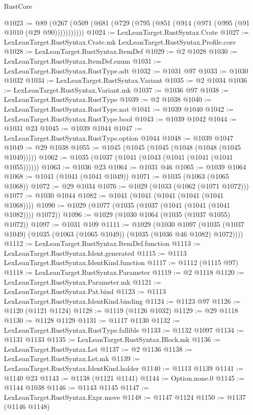 \begin{lexlean}{RustCore}
\begin{coremodule}
@1023 := @89 (@267 (@509 (@681 (@729 (@795 (@851 (@914 (@971 (@995 (@91 @1010 (@29 @90)))))))))))
@1024 := LexLeanTarget.RustSyntax.Crate
@1027 := LexLeanTarget.RustSyntax.Crate.mk LexLeanTarget.RustSyntax.Profile.core
@1028 := LexLeanTarget.RustSyntax.ItemDef
@1029 := @2 @1028
@1030 := LexLeanTarget.RustSyntax.ItemDef.enum
@1031 := LexLeanTarget.RustSyntax.RustType.adt
@1032 := @1031 @97
@1033 := @1030 @1032
@1034 := LexLeanTarget.RustSyntax.Variant
@1035 := @2 @1034
@1036 := LexLeanTarget.RustSyntax.Variant.mk
@1037 := @1036 @97
@1038 := LexLeanTarget.RustSyntax.RustType
@1039 := @2 @1038
@1040 := LexLeanTarget.RustSyntax.RustType.nat
@1041 := @1039 @1040
@1042 := LexLeanTarget.RustSyntax.RustType.bool
@1043 := @1039 @1042
@1044 := @1031 @23
@1045 := @1039 @1044
@1047 := LexLeanTarget.RustSyntax.RustType.option @1044
@1048 := @1039 @1047
@1049 := @29 @1038
@1055 := @1045 (@1045 (@1045 (@1048 (@1048 (@1045 @1049)))))
@1062 := @1035 (@1037 (@1041 (@1043 (@1041 (@1041 (@1041 @1055))))))
@1063 := @1036 @23
@1064 := @1031 @46
@1065 := @1039 @1064
@1068 := @1041 (@1041 (@1041 @1049))
@1071 := @1035 (@1063 (@1065 @1068))
@1072 := @29 @1034
@1076 := @1029 (@1033 (@1062 (@1071 @1072)))
@1077 := @1030 @1044
@1082 := @1041 (@1041 (@1041 (@1041 (@1041 @1068))))
@1090 := @1029 (@1077 (@1035 (@1037 (@1041 (@1041 (@1041 @1082)))) @1072))
@1096 := @1029 (@1030 @1064 (@1035 (@1037 @1055) @1072))
@1097 := @1031 @109
@1111 := @1029
    (@1030
      @1097
      (@1035 (@1037 @1049) (@1035 (@1063 (@1065 @1049)) (@1035 (@1036 @46 @1082) @1072))))
@1112 := LexLeanTarget.RustSyntax.ItemDef.function
@1113 := LexLeanTarget.RustSyntax.Ident.generated
@1115 := @1113 LexLeanTarget.RustSyntax.IdentKind.function
@1117 := @1112 (@1115 @97)
@1118 := LexLeanTarget.RustSyntax.Parameter
@1119 := @2 @1118
@1120 := LexLeanTarget.RustSyntax.Parameter.mk
@1121 := LexLeanTarget.RustSyntax.Pat.bind
@1123 := @1113 LexLeanTarget.RustSyntax.IdentKind.binding
@1124 := @1123 @97
@1126 := @1120 (@1121 @1124)
@1128 := @1119 (@1126 @1032)
@1129 := @29 @1118
@1130 := @1128 @1129
@1131 := @1117 @1130
@1132 := LexLeanTarget.RustSyntax.RustType.fallible
@1133 := @1132 @1097
@1134 := @1131 @1133
@1135 := LexLeanTarget.RustSyntax.Block.mk
@1136 := LexLeanTarget.RustSyntax.Let
@1137 := @2 @1136
@1138 := LexLeanTarget.RustSyntax.Let.mk
@1139 := LexLeanTarget.RustSyntax.IdentKind.holder
@1140 := @1113 @1139
@1141 := @1140 @23
@1143 := @1138 (@1121 @1141)
@1144 := Option.none.{0}
@1145 := @1144 @1038
@1146 := @1143 @1145
@1147 := LexLeanTarget.RustSyntax.Expr.move
@1148 := @1147 @1124
@1150 := @1137 (@1146 @1148)

\end{coremodule}
\end{lexlean}
